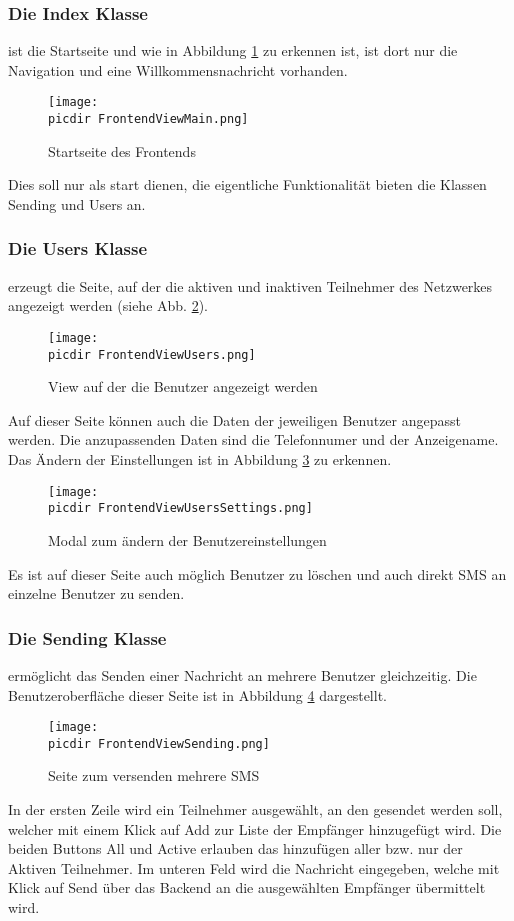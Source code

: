 \subsubsection*{Die Index Klasse} ist die Startseite und wie in Abbildung \ref{fig:view_main} zu erkennen ist, ist dort nur die Navigation und eine Willkommensnachricht vorhanden. 
\begin{figure}[h]
	\centering
	\texttt{[image: \\picdir FrontendViewMain.png]}
	\caption{Startseite des Frontends}
	\label{fig:view_main}
\end{figure}
Dies soll nur als start dienen, die eigentliche Funktionalität bieten die Klassen Sending und Users an. 

\FloatBarrier
\subsubsection*{Die Users Klasse} erzeugt die Seite, auf der die aktiven und inaktiven Teilnehmer des Netzwerkes angezeigt werden (siehe Abb. \ref{fig:view_user}). 
\begin{figure}[h]
	\centering
	\texttt{[image: \\picdir FrontendViewUsers.png]}
	\caption{View auf der die Benutzer angezeigt werden}
	\label{fig:view_user}
\end{figure}
Auf dieser Seite können auch die Daten der jeweiligen Benutzer angepasst werden. Die anzupassenden Daten sind die Telefonnumer und der Anzeigename.
Das Ändern der Einstellungen ist in Abbildung \ref{fig:view_user_settings} zu erkennen.
\begin{figure}[h]
	\centering
	\texttt{[image: \\picdir FrontendViewUsersSettings.png]}
	\caption{Modal zum ändern der Benutzereinstellungen}
	\label{fig:view_user_settings}
\end{figure}
Es ist auf dieser Seite auch möglich Benutzer zu löschen und auch direkt SMS an einzelne Benutzer zu senden.

\FloatBarrier
\subsubsection*{Die Sending Klasse}
ermöglicht das Senden einer Nachricht an mehrere Benutzer gleichzeitig. Die Benutzeroberfläche dieser Seite ist in Abbildung \ref{fig:view_sending} dargestellt.
\begin{figure}[h!]
	\centering
	\texttt{[image: \\picdir FrontendViewSending.png]}
	\caption{Seite zum versenden mehrere SMS}
	\label{fig:view_sending}
\end{figure}
In der ersten Zeile wird ein Teilnehmer ausgewählt, an den gesendet werden soll, welcher mit einem Klick auf Add zur Liste der Empfänger hinzugefügt wird. Die beiden Buttons All und Active erlauben das hinzufügen aller bzw. nur der Aktiven Teilnehmer. Im unteren Feld wird die Nachricht eingegeben, welche mit Klick auf Send über das Backend an die ausgewählten Empfänger übermittelt wird.

